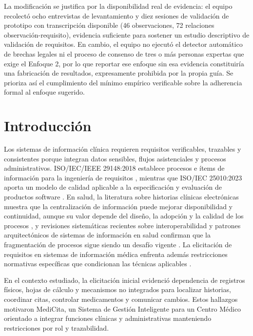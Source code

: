 \documentclass[runningheads]{llncs}
\begin{document}
	La modificación se justifica por la disponibilidad real de evidencia: el equipo recolectó ocho entrevistas de levantamiento y diez sesiones de validación de prototipo con transcripción disponible (46 observaciones, 72 relaciones observación-requisito), evidencia suficiente para sostener un estudio descriptivo de validación de requisitos. En cambio, el equipo no ejecutó el detector automático de brechas legales ni el proceso de consenso de tres o más personas expertas que exige el Enfoque 2, por lo que reportar ese enfoque sin esa evidencia constituiría una fabricación de resultados, expresamente prohibida por la propia guía. Se prioriza así el cumplimiento del mínimo empírico verificable sobre la adherencia formal al enfoque sugerido.
	
	\section{Introducción}
	Los sistemas de información clínica requieren requisitos verificables, trazables y consistentes porque integran datos sensibles, flujos asistenciales y procesos administrativos. ISO/IEC/IEEE 29148:2018 establece procesos e ítems de información para la ingeniería de requisitos \cite{iso29148,pohl2010}, mientras que ISO/IEC 25010:2023 aporta un modelo de calidad aplicable a la especificación y evaluación de productos software \cite{iso25010}. En salud, la literatura sobre historias clínicas electrónicas muestra que la centralización de información puede mejorar disponibilidad y continuidad, aunque su valor depende del diseño, la adopción y la calidad de los procesos \cite{hayrinen2008,campanella2016}, y revisiones sistemáticas recientes sobre interoperabilidad y patrones arquitectónicos de sistemas de información en salud confirman que la fragmentación de procesos sigue siendo un desafío vigente \cite{torabmiandoab2023,casanova2025}. La elicitación de requisitos en sistemas de información médica enfrenta además restricciones normativas específicas que condicionan las técnicas aplicables \cite{hernandezgonzalez2025}.
	
	En el contexto estudiado, la elicitación inicial evidenció dependencia de registros físicos, hojas de cálculo y mecanismos no integrados para localizar historias, coordinar citas, controlar medicamentos y comunicar cambios. Estos hallazgos motivaron MediCita, un Sistema de Gestión Inteligente para un Centro Médico orientado a integrar funciones clínicas y administrativas manteniendo restricciones por rol y trazabilidad.
	
\end{document}
